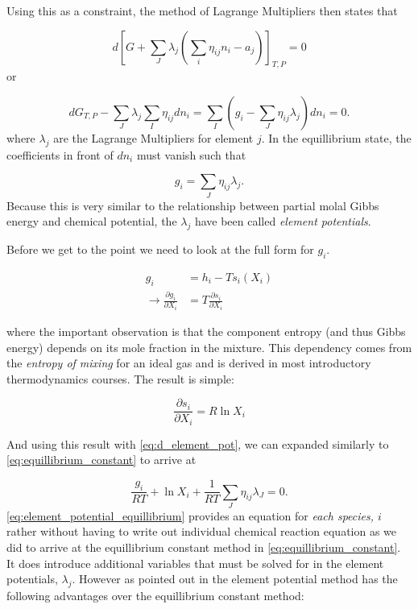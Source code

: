 \documentclass[twocolumn]{memoir} %
\begin{document}
Using this as a constraint, the method of Lagrange Multipliers then states that

\begin{equation*}
    d\left[G + \sum \limits_J \lambda_j \left(\sum \limits_i \eta_{ij}n_i - a_j\right)\right]_{T,P} = 0
\end{equation*}
%
or

\begin{equation}
    dG_{T,P} - \sum_J\lambda_j\sum_I \eta_{ij}dn_i = \sum_I\left(g_i - \sum_J \eta_{ij}\lambda_j\right)dn_i = 0.
    \label{eq:d_element_pot}
\end{equation}
%
where $\lambda_j$ are the Lagrange Multipliers for element $j$.  In the equillibrium state, the coefficients in
front of $dn_i$ must vanish such that

\begin{equation}
    g_i = \sum_J\eta_{ij}\lambda_j.
\end{equation}
%
Because this is very similar to the relationship between partial molal Gibbs energy and chemical potential,
the $\lambda_j$ have been called \emph{element potentials}.

Before we get to the point we need to look at the full form for $g_i$.

\begin{equation}
    \begin{split}
        g_i &= h_i - T s_i(X_i)\\
        \rightarrow \frac{\partial g_i}{\partial X_i} &= T\frac{\partial s_i}{\partial X_i}
    \end{split}
\end{equation}

where the important observation is that the component entropy (and thus Gibbs energy) depends on its mole
fraction in the mixture.  This dependency comes from the \emph{entropy of mixing} for an ideal gas and is 
derived in most introductory thermodynamics courses.  The result is simple:

\begin{equation}
    \frac{\partial s_i}{\partial X_i} = R \ln X_i
\end{equation}


And using this result with \cref{eq:d_element_pot}, we can expanded similarly to \cref{eq:equillibrium_constant}
to arrive at

\begin{equation}
    \frac{g_i}{RT} + \ln X_i + \frac{1}{RT}\sum_J \eta_{ij} \lambda_J = 0.
    \label{eq:element_potential_equillibrium}
\end{equation}
%
\cref{eq:element_potential_equillibrium} provides an equation for \emph{each species, $i$} rather without
having to write out individual chemical reaction equation as we did to arrive at the equillibrium constant
method in \cref{eq:equillibrium_constant}.  It does introduce additional variables that must be solved for
in the element potentials, $\lambda_j$.  However as pointed out in \cite{gordon0} the element potential method
has the following advantages over the equillibrium constant method:
\end{document}
